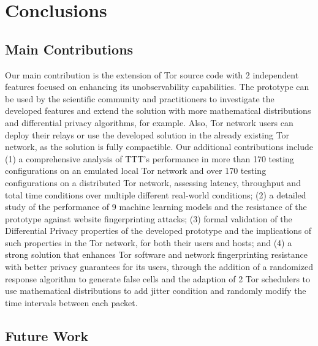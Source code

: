 
%

\chapter{Conclusions}\label{cha:conclusions}

\section{Main Contributions}\label{sec:main_conclusions}

Our main contribution is the extension of Tor source code with 2 independent features focused on enhancing its unobservability capabilities. The prototype can be used by the scientific community and practitioners to investigate the developed features and extend the solution with more mathematical distributions and differential privacy algorithms, for example. Also, Tor network users can deploy their relays or use the developed solution in the already existing Tor network, as the solution is fully compactible. Our additional contributions include (1) a comprehensive analysis of TTT's performance in more than 170 testing configurations on an emulated local Tor network and over 170 testing configurations on a distributed Tor network, assessing latency, throughput and total time conditions over multiple different real-world conditions; (2) a detailed study of the performance of 9 machine learning models and the resistance of the prototype against website fingerprinting attacks; (3) formal validation of the Differential Privacy properties of the developed prototype and the implications of such properties in the Tor network, for both their users and hosts; and (4) a strong solution that enhances Tor software and network fingerprinting resistance with better privacy guarantees for its users, through the addition of a randomized response algorithm to generate false cells and the adaption of 2 Tor schedulers to use mathematical distributions to add jitter condition and randomly modify the time intervals between each packet.

\section{Future Work}\label{sec:future_work}

